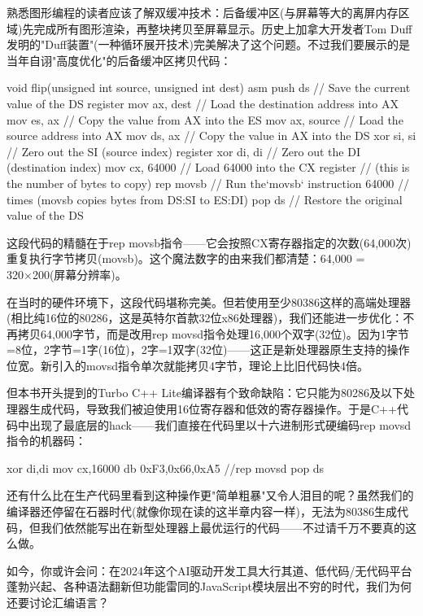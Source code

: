 熟悉图形编程的读者应该了解双缓冲技术：后备缓冲区(与屏幕等大的离屏内存区域)先完成所有图形渲染，再整块拷贝至屏幕显示。历史上加拿大开发者Tom Duff发明的"Duff装置"(一种循环展开技术)完美解决了这个问题。不过我们要展示的是当年自诩"高度优化"的后备缓冲区拷贝代码：

\begin{cpp}
void flip(unsigned int source, unsigned int dest) {
asm {
    push ds // Save the current value of the DS register
    mov ax, dest // Load the destination address into AX
    mov es, ax // Copy the value from AX into the ES
    mov ax, source // Load the source address into AX
    mov ds, ax // Copy the value in AX into the DS
    xor si, si // Zero out the SI (source index) register
    xor di, di // Zero out the DI (destination index)
    mov cx, 64000 // Load 64000 into the CX register
    // (this is the number of bytes to copy)
    rep movsb // Run the`movsb` instruction 64000
    // times (movsb copies bytes from DS:SI to ES:DI)
    pop ds // Restore the original value of the DS
  } 
}
\end{cpp}

这段代码的精髓在于rep movsb指令——它会按照CX寄存器指定的次数(64,000次)重复执行字节拷贝(movsb)。这个魔法数字的由来我们都清楚：64,000 = 320×200(屏幕分辨率)。

在当时的硬件环境下，这段代码堪称完美。但若使用至少80386这样的高端处理器(相比纯16位的80286，这是英特尔首款32位x86处理器)，我们还能进一步优化：不再拷贝64,000字节，而是改用rep movsd指令处理16,000个双字(32位)。因为1字节=8位，2字节=1字(16位)，2字=1双字(32位)——这正是新处理器原生支持的操作位宽。新引入的movsd指令单次就能拷贝4字节，理论上比旧代码快4倍。

但本书开头提到的Turbo C++ Lite编译器有个致命缺陷：它只能为80286及以下处理器生成代码，导致我们被迫使用16位寄存器和低效的寄存器操作。于是C++代码中出现了最底层的hack——我们直接在代码里以十六进制形式硬编码rep movsd指令的机器码：

\begin{shell}
xor di,di
mov cx,16000
db 0xF3,0x66,0xA5 //rep movsd
pop ds
\end{shell}

还有什么比在生产代码里看到这种操作更"简单粗暴"又令人泪目的呢？虽然我们的编译器还停留在石器时代(就像你现在读的这半章内容一样)，无法为80386生成代码，但我们依然能写出在新型处理器上最优运行的代码——不过请千万不要真的这么做。


如今，你或许会问：在2024年这个AI驱动开发工具大行其道、低代码/无代码平台蓬勃兴起、各种语法翻新但功能雷同的JavaScript模块层出不穷的时代，我们为何还要讨论汇编语言？

